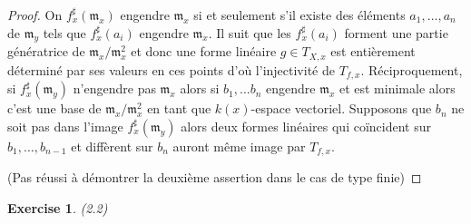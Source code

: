 \documentclass[A4, 11pt]{article}
\newtheorem{exer}{Exercise}
\begin{document}
\begin{proof}
On $f^{\sharp}_x(\mathfrak{m}_x)$ engendre $\mathfrak{m}_x$ si et seulement s'il existe des éléments $a_1,\dots, a_n$ de $\mathfrak{m}_y$ tels que $f^{\sharp}_x(a_i)$ engendre $\mathfrak{m}_x$. Il suit que les $f^{\sharp}_x(a_i)$ forment une partie génératrice de $\mathfrak{m}_x/\mathfrak{m}_x^2$ et donc une forme linéaire $g\in T_{X,x}$ est entièrement déterminé par ses valeurs en ces points d'où l'injectivité de $T_{f,x}$. Réciproquement, si $f^{\sharp}_x(\mathfrak{m}_y)$ n'engendre pas $\mathfrak{m}_x$ alors si $b_1,\dots b_n$ engendre $\mathfrak{m}_x$ et est minimale alors c'est une base de $\mathfrak{m}_x/\mathfrak{m}_x^2$ en tant que $k(x)$-espace vectoriel. Supposons que $b_n$ ne soit pas dans l'image $f^{\sharp}_x(\mathfrak{m}_y)$ alors deux formes linéaires qui coïncident sur $b_1,\dots, b_{n-1}$ et diffèrent sur $b_n$ auront même image par $T_{f,x}$.

(Pas réussi à démontrer la deuxième assertion dans le cas de type finie)
\end{proof}
\begin{exer}(2.2)
\end{exer}
\end{document}

